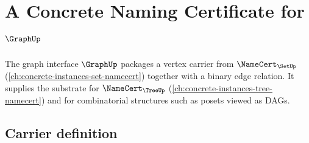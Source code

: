 \chapter{A Concrete Naming Certificate for $\GraphUp$}
\label{ch:concrete-instances-graph-namecert}

The graph interface $\GraphUp$ packages a vertex carrier from $\NameCert_{\SetUp}$ (\autoref{ch:concrete-instances-set-namecert}) together with a binary edge relation. It supplies the substrate for $\NameCert_{\TreeUp}$ (\autoref{ch:concrete-instances-tree-namecert}) and for combinatorial structures such as posets viewed as DAGs.

\section{Carrier definition}
\label{sec:graph-carrier}

